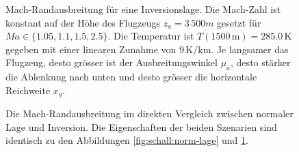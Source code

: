 \begin{figure}
    \centering
{}
    \caption{Mach-Randausbreitung für eine Inversionslage. Die Mach-Zahl
    ist konstant auf der Höhe des Flugzeugs $z_a=3\,500 m$ gesetzt für
    $\textit{Ma} \in \{1.05, 1.1, 1.5, 2.5 \}$.
    Die Temperatur ist $T(1500\,\textrm{m}) = 285.0\,\mathrm{K}$ gegeben mit einer
    linearen Zunahme von $9\,\mathrm{K/km}$.
    Je langsamer das Flugzeug, desto grösser ist der Ausbreitungswinkel
    $\mu_a$, desto stärker die Ablenkung nach unten und desto
    grösser die horizontale Reichweite $x_g$.}
    \label{fig:schall:inv-lage}
\end{figure}

\begin{figure}
    \centering
{}
    \caption{Die Mach-Randausbreitung im direkten Vergleich zwischen
    normaler Lage und Inversion. Die Eigenschaften der beiden Szenarien
    sind identisch zu den Abbildungen \ref{fig:schall:norm-lage}
    und \ref{fig:schall:inv-lage}.}
    \label{fig:schall:norm-vs-inv-lage}
\end{figure}
